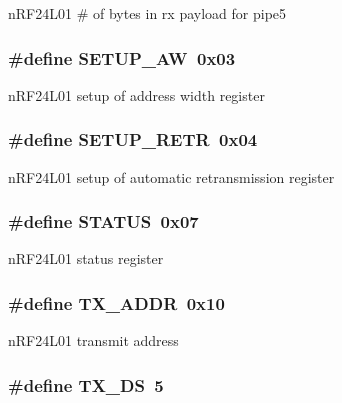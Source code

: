 nRF24L01 \# of bytes in rx payload for pipe5 \hypertarget{group__nordic__hal__nrf__reg_gaf5ef355ba3eca336db1285cab353ddc2}{
\subsubsection[{SETUP\_\-AW}]{\setlength{\rightskip}{0pt plus 5cm}\#define SETUP\_\-AW~0x03}}
\label{group__nordic__hal__nrf__reg_gaf5ef355ba3eca336db1285cab353ddc2}
nRF24L01 setup of address width register \hypertarget{group__nordic__hal__nrf__reg_ga2188309b3eceeae158dd64109cd919aa}{
\subsubsection[{SETUP\_\-RETR}]{\setlength{\rightskip}{0pt plus 5cm}\#define SETUP\_\-RETR~0x04}}
\label{group__nordic__hal__nrf__reg_ga2188309b3eceeae158dd64109cd919aa}
nRF24L01 setup of automatic retransmission register \hypertarget{group__nordic__hal__nrf__reg_ga59279bee44f34d08b3cbf3a89fb0d8d9}{
\subsubsection[{STATUS}]{\setlength{\rightskip}{0pt plus 5cm}\#define STATUS~0x07}}
\label{group__nordic__hal__nrf__reg_ga59279bee44f34d08b3cbf3a89fb0d8d9}
nRF24L01 status register \hypertarget{group__nordic__hal__nrf__reg_gaa734c6e08b9f794436eacbabe466a6c4}{
\subsubsection[{TX\_\-ADDR}]{\setlength{\rightskip}{0pt plus 5cm}\#define TX\_\-ADDR~0x10}}
\label{group__nordic__hal__nrf__reg_gaa734c6e08b9f794436eacbabe466a6c4}
nRF24L01 transmit address \hypertarget{group__nordic__hal__nrf__reg_gab5f5243908a39ffd514fe701e9749bdc}{
\subsubsection[{TX\_\-DS}]{\setlength{\rightskip}{0pt plus 5cm}\#define TX\_\-DS~5}}
